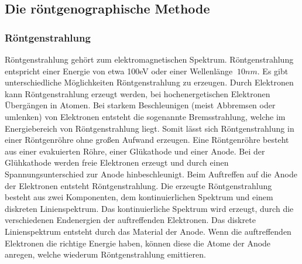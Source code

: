     \subsection{Die röntgenographische Methode}

        \subsubsection{Röntgenstrahlung}    
            Röntgenstrahlung gehört zum elektromagnetischen Spektrum. Röntgenstrahlung entspricht einer Energie von etwa
            100eV oder einer Wellenlänge $~10 nm$. Es gibt unterschiedliche Möglichkeiten Röntgenstrahlung zu erzeugen. 
            Durch Elektronen kann Röntgenstrahlung erzeugt werden, bei hochenergetischen Elektronen Übergängen in Atomen. 
            Bei starkem Beschleunigen (meist Abbremsen oder umlenken) von Elektronen entsteht die sogenannte Bremsstrahlung, welche im Energiebereich
            von Röntgenstrahlung liegt. Somit lässt sich Röntgenstrahlung in einer Röntgenröhre ohne großen Aufwand erzeugen.
            Eine Röntgenröhre besteht aus einer evakuierten Röhre, einer Glükathode und einer Anode. Bei der Glühkathode werden
            freie Elektronen erzeugt und durch einen Spannungsunterschied zur Anode hinbeschleunigt. Beim Auftreffen auf die Anode
            der Elektronen entsteht Röntgenstrahlung. Die erzeugte Röntgenstrahlung besteht aus zwei Komponenten, dem kontinuierlichen Spektrum
            und einem diskreten Linienspektrum. Das kontinuierliche Spektrum wird erzeugt, durch die verschiedenen Endenergien der auftreffenden Elektronen. 
            Das diskrete Linienspektrum entsteht durch das Material der Anode. Wenn die auftreffenden Elektronen die richtige Energie haben, 
            können diese die Atome der Anode anregen, welche wiederum Röntgenstrahlung emittieren.

